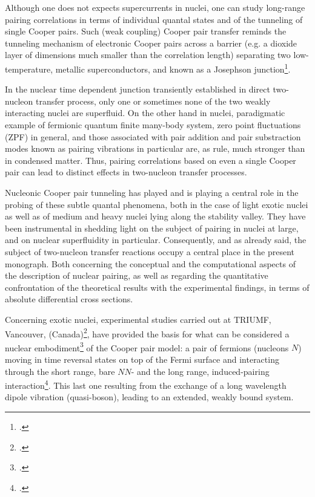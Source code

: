  
Although one does not expects supercurrents in nuclei, one can study long-range pairing correlations in terms of individual quantal states and of the tunneling of single Cooper pairs. Such (weak coupling) Cooper pair transfer reminds  the tunneling mechanism of electronic Cooper pairs across a barrier (e.g. a dioxide layer of dimensions much smaller than the correlation length) separating two low-temperature, metallic superconductors, and known as a Josephson junction\footnote{\cite{Josephson:62,Anderson:64b}.}.
  
  
In the nuclear time dependent junction transiently established in  direct two-nucleon transfer process, only one or sometimes none of the two weakly interacting nuclei are superfluid.  On the other hand in nuclei, paradigmatic example of fermionic quantum  finite many-body system, zero point fluctuations  (ZPF) in general, and those associated with pair addition and pair substraction modes known as pairing vibrations in particular are, as  rule, much stronger than in condensed matter. Thus, pairing correlations based on even  a single Cooper pair can lead to distinct  effects in two-nucleon transfer processes. 
  
  
Nucleonic Cooper pair tunneling has played and is playing a central role in the probing of these subtle quantal phenomena, both in the case of  light exotic nuclei as well as of medium and heavy nuclei lying along the stability valley. They  have been instrumental in shedding light on the subject of pairing in nuclei at large, and on nuclear superfluidity in particular. Consequently, and as already said, the subject of two-nucleon transfer reactions occupy  a central place in the present monograph. Both concerning the conceptual and the computational aspects of the description of nuclear pairing, as well as regarding the quantitative confrontation of the theoretical  results  with the experimental findings, in terms of absolute differential cross sections.
 

Concerning exotic nuclei, experimental studies carried out at TRIUMF, Vancouver, (Canada)\footnote{\cite{Tanihata:08}.}, have provided the basis for what can be considered a nuclear embodiment\footnote{\cite{Barranco:01,Potel:10}.} of the Cooper pair model: a pair of fermions (nucleons $N$) moving in time reversal states on top of the Fermi surface and interacting through the short range, bare $NN$- and the long range, induced-pairing interaction\footnote{\cite{Frohlich:52,Bardeen:55}.}. This last one resulting from the exchange of a long wavelength dipole vibration (quasi-boson), leading to an extended, weakly bound system.

